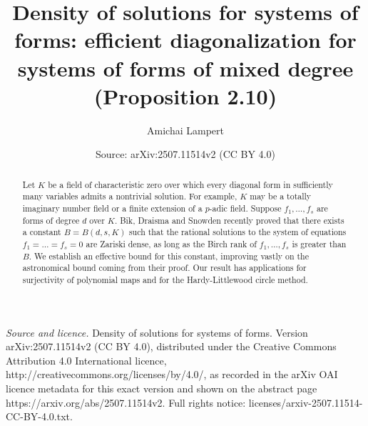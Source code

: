 \documentclass[10pt,a4paper]{amsart}
\author{Amichai Lampert}
\title[Density of solutions for systems of forms]{Density of solutions for systems of forms: efficient diagonalization for systems of forms of mixed degree (Proposition 2.10)}
\date{Source: arXiv:2507.11514v2 (CC BY 4.0)}
\theoremstyle{definition}
\begin{document}
\begin{abstract}
    Let $K$ be a field of characteristic zero over which every diagonal form in sufficiently many variables admits a nontrivial solution. For example, $K$ may be a totally imaginary number field or a finite extension of a $p$-adic field. Suppose $f_1,\ldots,f_s$ are forms of degree $d$ over $K.$ Bik, Draisma and Snowden recently proved that there exists a constant $B = B(d,s,K)$ such that the rational solutions to the system of equations $f_1=\ldots=f_s = 0$ are Zariski dense, as long as the Birch rank of $f_1,\ldots,f_s$ is greater than $B.$ We establish an effective bound for this constant, improving vastly on the astronomical bound coming from their proof. Our result has applications for surjectivity of polynomial maps and for the Hardy-Littlewood circle method.
\end{abstract}
\maketitle
\noindent\emph{Source and licence.} Density of solutions for systems of forms. Version arXiv:2507.11514v2 (CC BY 4.0), distributed under the Creative Commons Attribution 4.0 International licence, http://creativecommons.org/licenses/by/4.0/, as recorded in the arXiv OAI licence metadata for this exact version and shown on the abstract page https://arxiv.org/abs/2507.11514v2. Full rights notice: licenses/arxiv-2507.11514-CC-BY-4.0.txt.\par\smallskip
\end{document}

